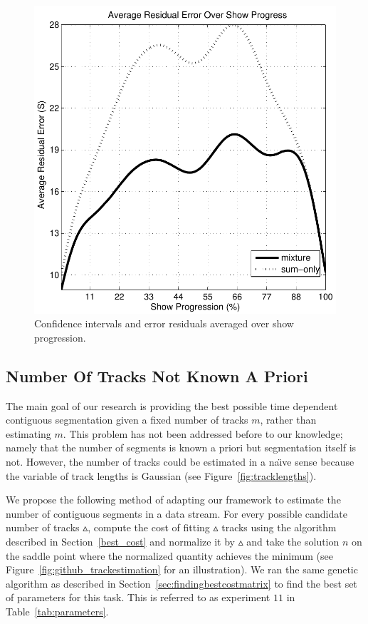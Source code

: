 \documentclass[twocolumn]{article}
\begin{document}
\begin{figure}
	\includegraphics[scale=0.4]{images/conf/residualsagainstprogress}
	
	\caption{Confidence intervals and error residuals averaged over show progression.}
	\label{fig:confidence_intervals}
	
\end{figure}


\subsection{Number Of Tracks Not Known A Priori}\label{sec:trackcount}

The main goal of our research is providing the best possible time dependent contiguous segmentation given a fixed number of tracks $m$, rather than estimating $m$. This problem has not been addressed before to our knowledge; namely that the number of segments is known a priori but segmentation itself is not. However, the number of tracks could be estimated in a na\"{\i}ve sense because the variable of track lengths is Gaussian (see Figure~\ref{fig:tracklengths}). 


We propose the following method of adapting our framework to estimate the number of contiguous segments in a data stream. For every possible candidate number of tracks $\vartriangle$, compute the cost of fitting $\vartriangle$ tracks using the algorithm described in Section~\ref{best_cost} and normalize it by $\vartriangle$ and take the solution $n$ on the saddle point where the normalized quantity achieves the minimum (see Figure~\ref{fig:github_trackestimation} for an illustration). We ran the same genetic algorithm as described in Section~\ref{sec:findingbestcostmatrix} to find the best set of parameters for this task. This is referred to as experiment $11$ in Table~\ref{tab:parameters}.
\end{document}
